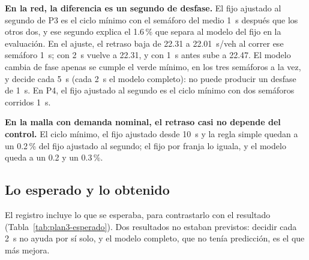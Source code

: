 \begin{table}[H]
\centering
\footnotesize
\setlength{\tabcolsep}{3pt}

\caption[Segundo estudio: margen de mejora en cada caso]{Margen de mejora con llegadas aleatorias, en la tanda 1: retraso total con el fijo ajustado al segundo, cambio de la mejor de las otras nueve referencias frente a él (entre paréntesis, cuál es) y cambio del modelo citado.}
\label{tab:plan3-margen}
\end{table}

\textbf{En la red, la diferencia es un segundo de desfase.} El fijo
ajustado al segundo de P3 es el ciclo mínimo con el semáforo del medio
1~s después que los otros dos, y ese segundo explica el 1.6\,\% que
separa al modelo del fijo en la evaluación. En el ajuste, el retraso
baja de 22.31 a 22.01~s/veh al correr ese semáforo 1~s; con 2~s vuelve
a 22.31, y con 1~s antes sube a 22.47. El modelo cambia de fase apenas
se cumple el verde mínimo, en los tres semáforos a la vez, y decide
cada 5~s (cada 2~s el modelo completo): no puede producir un desfase de
1~s. En P4, el fijo ajustado al segundo es el ciclo mínimo con dos
semáforos corridos 1~s.

\textbf{En la malla con demanda nominal, el retraso casi no depende del
control.} El ciclo mínimo, el fijo ajustado desde 10~s y la regla
simple quedan a un 0.2\,\% del fijo ajustado al segundo; el fijo por
franja lo iguala, y el modelo queda a un 0.2 y un 0.3\,\%.

\subsection*{Lo esperado y lo obtenido}

El registro incluye lo que se esperaba, para contrastarlo con el
resultado (Tabla~\ref{tab:plan3-esperado}). Dos resultados no estaban previstos:
decidir cada 2~s no ayuda por sí solo, y el modelo completo, que no
tenía predicción, es el que más mejora.

